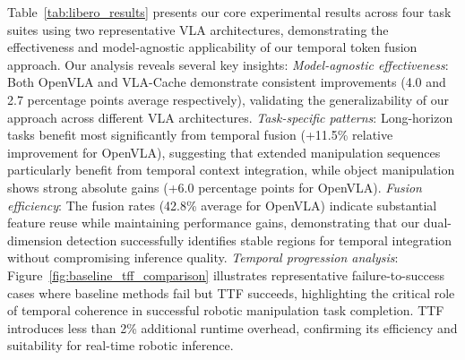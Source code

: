 \documentclass[letterpaper]{article}
\begin{document}
Table~\ref{tab:libero_results} presents our core experimental results across four task suites using two representative VLA architectures, demonstrating the effectiveness and model-agnostic applicability of our temporal token fusion approach. Our analysis reveals several key insights: \textit{Model-agnostic effectiveness}: Both OpenVLA and VLA-Cache demonstrate consistent improvements (4.0 and 2.7 percentage points average respectively), validating the generalizability of our approach across different VLA architectures. \textit{Task-specific patterns}: Long-horizon tasks benefit most significantly from temporal fusion (+11.5\% relative improvement for OpenVLA), suggesting that extended manipulation sequences particularly benefit from temporal context integration, while object manipulation shows strong absolute gains (+6.0 percentage points for OpenVLA). \textit{Fusion efficiency}: The fusion rates (42.8\% average for OpenVLA) indicate substantial feature reuse while maintaining performance gains, demonstrating that our dual-dimension detection successfully identifies stable regions for temporal integration without compromising inference quality. \textit{Temporal progression analysis}: Figure~\ref{fig:baseline_tff_comparison} illustrates representative failure-to-success cases where baseline methods fail but TTF succeeds, highlighting the critical role of temporal coherence in successful robotic manipulation task completion. TTF introduces less than 2\% additional runtime overhead, confirming its efficiency and suitability for real-time robotic inference.
\end{document}
